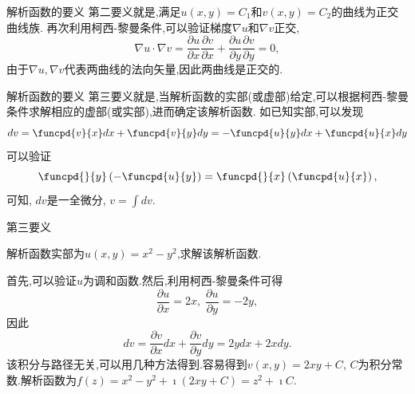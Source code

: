 \documentclass[fontset=windows, chinese, 10pt]{beamer}
\begin{document}
\begin{frame}{解析函数的要义}
  \small
第二要义就是,满足$u(x,y) = C_1$和$v(x,y)= C_2$的曲线为正交曲线族.
再次利用柯西-黎曼条件,可以验证梯度$\nabla u $和$\nabla v$正交,
\begin{equation}
    \nabla u \cdot \nabla v = \frac{\partial u}{\partial x} 
    \frac{\partial v}{\partial x}+\frac{\partial u}{\partial y} \frac{\partial v}{\partial y}=0 ,
\end{equation}
由于$\nabla u, \nabla v$代表两曲线的法向矢量,因此两曲线是正交的.

\begin{figure}
  \centering
    \scalebox{0.8}
  {

  }

\end{figure}
\end{frame}

\begin{frame}{解析函数的要义}
第三要义就是,当解析函数的实部(或虚部)给定,可以根据柯西-黎曼条件求解相应的虚部(或实部),进而确定该解析函数.
如已知实部,可以发现
\begin{equation}
    d v = \funcpd{v}{x} dx + \funcpd{v}{y} dy = -\funcpd{u}{y} dx + \funcpd{u}{x} dy
\end{equation}
可以验证 
$$
\funcpd{}{y} \left( - \funcpd{u}{y} \right) = \funcpd{}{x} \left( \funcpd{u}{x} \right) , 
$$
可知, $dv$是一全微分, $v = \int dv$.
\end{frame}


\begin{frame}{第三要义}
\begin{example}
解析函数实部为$u(x,y) = x^2 - y^2$,求解该解析函数.
\end{example}
\begin{solution}
首先,可以验证$u$为调和函数.然后,利用柯西-黎曼条件可得
\begin{equation}
    \frac{\partial u}{\partial x } = 2x, \; \frac{\partial u}{\partial y } = -2y  ,
\end{equation}
因此
\begin{equation}
    d v = \frac{\partial v}{\partial x } dx + \frac{\partial v}{\partial y } dy = 2y dx + 2x dy .
\end{equation}
该积分与路径无关,可以用几种方法得到.容易得到$v(x,y) = 2xy + C$, $C$为积分常数.解析函数为$f(z)=x^2 - y^2 + \imath (2x y + C) = z^2 + \imath C$.
\end{solution}
\end{frame}
\end{document}
